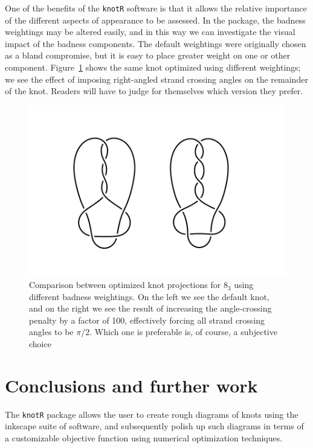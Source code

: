 \documentclass{birkjour}
\theoremstyle{definition}
\theoremstyle{remark}
\numberwithin{equation}{section}
\begin{document}
One of the benefits of the {\tt knotR} software is that it allows the
relative importance of the different aspects of appearance to be
assessed.  In the package, the badness weightings may be altered
easily, and in this way we can investigate the visual impact of the
badness components.  The default weightings were originally chosen as
a bland compromise, but it is easy to place greater weight on one or
other component.  Figure~\ref{figure_cca} shows the same knot optimized
using different weightings; we see the effect of imposing right-angled
strand crossing angles on the remainder of the knot.  Readers will
have to judge for themselves which version they prefer.

\begin{figure}[htbp]
  \begin{center}
\includegraphics[width=13cm]{compare_crossing_angles}  %
\caption{Comparison between optimized knot projections for $8_3$
  \label{figure_cca} using different  badness weightings.  On the
  left we see the default knot, and on the right we see the result of
  increasing the angle-crossing penalty by a factor of 100,
  effectively forcing all strand crossing angles to be $\pi/2$.  Which
  one is preferable is, of course, a subjective choice}
  \end{center}
\end{figure}


\section{Conclusions and further work}

The {\tt knotR} package allows the user to create rough diagrams of
knots using the inkscape suite of software, and subsequently polish up
such diagrams in terms of a customizable objective function using
numerical optimization techniques.
\end{document}
